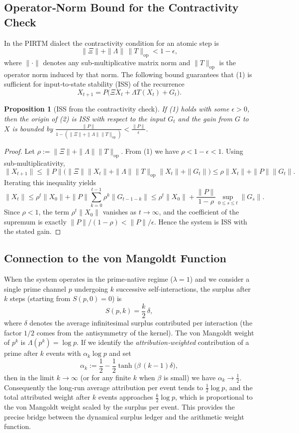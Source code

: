 \documentclass[11pt]{article}
\newtheorem{proposition}{Proposition}
\begin{document}
\subsection{Operator‑Norm Bound for the Contractivity Check}
In the PIRTM dialect the contractivity condition for an atomic step is
\[
    \|\Xi\|+\|\Lambda\|\,\|T\|_{\mathrm{op}} < 1-\epsilon,
\tag{1}
\]
where $\|\cdot\|$ denotes any sub‑multiplicative matrix norm and $\|T\|_{\mathrm{op}}$ is the operator norm induced by that norm.  
The following bound guarantees that (1) is sufficient for input‑to‑state stability (ISS) of the recurrence
\[
    X_{t+1}=P\bigl(\Xi X_t+\Lambda T(X_t)+G_t\bigr).
\tag{2}
\]
\begin{proposition}[ISS from the contractivity check]\label{prop:iss-bound}
If (1) holds with some $\epsilon>0$, then the origin of (2) is ISS with respect to the input $G_t$ and the gain from $G$ to $X$ is bounded by $\frac{\|P\|}{1-(\|\Xi\|+\|\Lambda\|\|T\|_{\mathrm{op}})}<\frac{\|P\|}{\epsilon}$.
\end{proposition}
\begin{proof}
Let $\rho:=\|\Xi\|+\|\Lambda\|\|T\|_{\mathrm{op}}$. From (1) we have $\rho<1-\epsilon<1$. Using sub‑multiplicativity,
\[
\|X_{t+1}\|\le\|P\|\bigl(\|\Xi\|\|X_t\|+\|\Lambda\|\|T\|_{\mathrm{op}}\|X_t\|+\|G_t\|\bigr)
          \le \rho\|X_t\|+\|P\|\|G_t\|.
\]
Iterating this inequality yields
\[
\|X_t\|\le\rho^t\|X_0\|+\|P\|\sum_{k=0}^{t-1}\rho^k\|G_{t-1-k}\|
      \le\rho^t\|X_0\|+\frac{\|P\|}{1-\rho}\sup_{0\le s\le t}\|G_s\|.
\]
Since $\rho<1$, the term $\rho^t\|X_0\|$ vanishes as $t\to\infty$, and the coefficient of the supremum is exactly $\|P\|/(1-\rho)<\|P\|/\epsilon$. Hence the system is ISS with the stated gain.
\end{proof}

\subsection{Connection to the von Mangoldt Function}
When the system operates in the prime‑native regime ($\lambda=1$) and we consider a single prime channel $p$ undergoing $k$ successive self‑interactions, the surplus after $k$ steps (starting from $S(p,0)=0$) is
\[
    S(p,k)=\frac{k}{2}\,\delta,
\]
where $\delta$ denotes the average infinitesimal surplus contributed per interaction (the factor $1/2$ comes from the antisymmetry of the kernel). The von Mangoldt weight of $p^k$ is $\Lambda(p^k)=\log p$.  If we identify the \emph{attribution‑weighted} contribution of a prime after $k$ events with $\alpha_k\log p$ and set
\[
    \alpha_k:=\frac12-\frac12\tanh\!\bigl(\beta\,(k-1)\delta\bigr),
\]
then in the limit $k\to\infty$ (or for any finite $k$ when $\beta$ is small) we have $\alpha_k\to\frac12$. Consequently the long‑run average attribution per event tends to $\frac12\log p$, and the total attributed weight after $k$ events approaches $\frac{k}{2}\log p$, which is proportional to the von Mangoldt weight scaled by the surplus per event. This provides the precise bridge between the dynamical surplus ledger and the arithmetic weight function.
\end{document}
